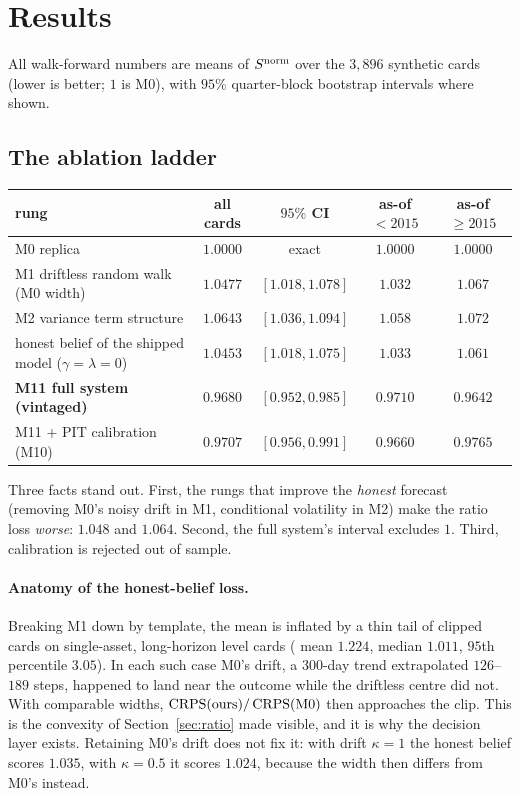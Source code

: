 \section{Results}\label{sec:results}

All walk-forward numbers are means of $S^{\mathrm{norm}}$ over the $3{,}896$ synthetic cards (lower is better; $1$ is M0), with $95\%$ quarter-block bootstrap
intervals where shown.

\subsection{The ablation ladder}

\begin{center}
{\small\begin{tabular}{lcccc}
\toprule
rung & all cards & $95\%$ CI & as-of $<2015$ & as-of $\ge2015$\\
\midrule
M0 replica & $1.0000$ & exact & $1.0000$ & $1.0000$\\
M1 driftless random walk (M0 width) & $1.0477$ & $[1.018,1.078]$ & $1.032$ & $1.067$\\
M2 variance term structure & $1.0643$ & $[1.036,1.094]$ & $1.058$ & $1.072$\\
honest belief of the shipped model ($\gamma=\lambda=0$) & $1.0453$ & $[1.018,1.075]$ & $1.033$ & $1.061$\\
\textbf{M11 full system (vintaged)} & $\mathbf{0.9680}$ & $\mathbf{[0.952,0.985]}$ & $0.9710$ & $\mathbf{0.9642}$\\
M11 + PIT calibration (M10) & $0.9707$ & $[0.956,0.991]$ & $0.9660$ & $0.9765$\\
\bottomrule
\end{tabular}}
\end{center}

Three facts stand out. First, the rungs that improve the \emph{honest} forecast (removing M0's noisy drift in M1, conditional volatility in M2)
make the ratio loss \emph{worse}: $1.048$ and $1.064$. Second, the full system's interval excludes $1$. Third, calibration is rejected
out of sample.

\paragraph{Anatomy of the honest-belief loss.} Breaking M1 down by template, the mean is inflated by a thin tail of clipped cards on single-asset,
long-horizon level cards ( mean $1.224$, median $1.011$, $95$th percentile $3.05$). In each such case M0's drift, a
$300$-day trend extrapolated $126$--$189$ steps, happened to land near the outcome while the driftless centre did not. With comparable widths,
$\operatorname{CRPS}(\text{ours})/\operatorname{CRPS}(\mathrm{M0})$ then approaches the clip. This is the convexity of Section~\ref{sec:ratio} made visible, and it is why the decision layer
exists. Retaining M0's drift does not fix it: with drift $\kappa=1$ the honest belief scores $1.035$, with $\kappa=0.5$ it scores $1.024$, because
the width then differs from M0's instead.

